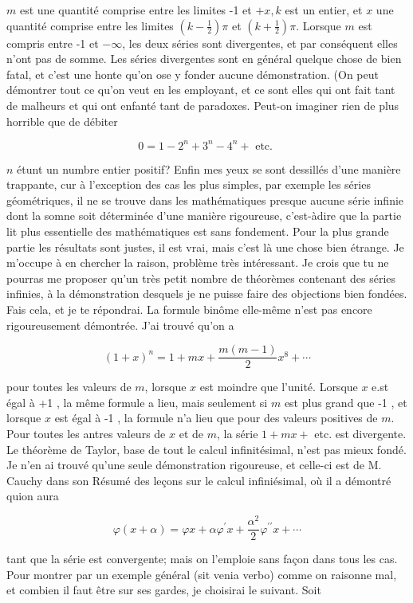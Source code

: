 \documentclass{article}
\begin{document}
\(m\) est une quantité comprise entre les limites -1 et \(+x, k\) est un entier, et \(x\) une quantité comprise entre les limites \(\left(k-\frac{1}{2}\right) \pi\) et \(\left(k+\frac{1}{2}\right) \pi\). Lorsque \(m\) est compris entre -1 et \(-\infty\), les deux séries sont divergentes, et par conséquent elles n'ont pas de somme. Les séries divergentes sont en général quelque chose de bien fatal, et c'est une honte qu'on ose y fonder aucune
démonstration. (On peut démontrer tout ce qu'on veut en les employant, et ce sont elles qui ont fait tant de malheurs et qui ont enfanté tant de paradoxes. Peut-on imaginer rien de plus horrible que de débiter

\[
0=1-2^{n}+3^{n}-4^{n}+\text { etc. }
\]

\(n\) étunt un numbre entier positif? Enfin mes yeux se sont dessillés d'une manière trappante, cur à l'exception des cas les plus simples, par exemple les séries géométriques, il ne se trouve dans les mathématiques presque aucune série infinie dont la somne soit déterminée d'une manière rigoureuse, c'est-àdire que la partie lit plus essentielle des mathématiques est sans fondement. Pour la plus grande partie les résultats sont justes, il est vrai, mais c'est là une chose bien étrange. Je m'occupe à en chercher la raison, problème très intéressant. Je crois que tu ne pourras me proposer qu'un très petit nombre de théorèmes contenant des séries infinies, à la démonstration desquels je ne puisse faire des objections bien fondées. Fais cela, et je te répondrai. La formule binôme elle-même n'est pas encore rigoureusement démontrée. J'ai trouvé qu'on a

\[
(1+x)^{n}=1+m x+\frac{m(m-1)}{2} x^{8}+\cdots
\]

pour toutes les valeurs de \(m\), lorsque \(x\) est moindre que l'unité. Lorsque \(x\) e.st égal à +1 , la même formule a lieu, mais seulement si \(m\) est plus grand que -1 , et lorsque \(x\) est égal à -1 , la formule n'a lieu que pour des valeurs positives de \(m\). Pour toutes les antres valeurs de \(x\) et de \(m\), la série \(1+m x+\) etc. est divergente. Le théorème de Taylor, base de tout le calcul infinitésimal, n'est pas mieux fondé. Je n'en ai trouvé qu'une seule démonstration rigoureuse, et celle-ci est de M. Cauchy dans son Résumé des leçons sur le calcul infiniésimal, où il a démontré quion aura

\[
\varphi(x+\alpha)=\varphi x+\alpha \varphi^{\prime} x+\frac{\alpha^{2}}{2} \varphi^{\prime \prime} x+\cdots
\]

tant que la série est convergente; mais on l'emploie sans façon dans tous les cas. Pour montrer par un exemple général (sit venia verbo) comme on raisonne mal, et combien il faut être sur ses gardes, je choisirai le suivant. Soit
\end{document}
